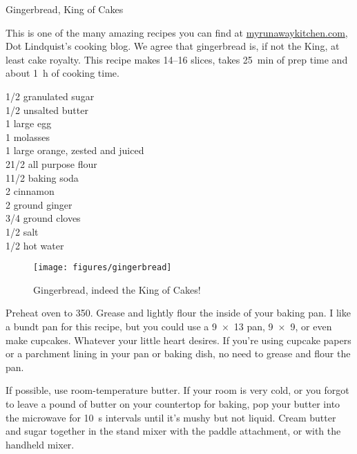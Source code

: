\begin{entry}{Gingerbread, King of Cakes}

\begin{open}
    This is one of the many amazing recipes you can find at
    \url{myrunawaykitchen.com}, Dot Lindquist's cooking blog.  We agree that
    gingerbread is, if not the King, at least cake royalty.  This recipe makes
    \numrange{14}{16} slices, takes \SI{25}{\minute} of prep time and about
    \SI{1}{\hour} of cooking time.
\end{open}
\begin{ingredients}
    \SI{1/2}{\cup}  granulated sugar\\
    \SI{1/2}{\cup}  unsalted butter\\
    1 large egg\\
    \SI{1}{\cup} molasses\\
    1 large orange, zested and juiced\\
    2\SI{1/2}{\cup}  all purpose flour\\
    1\SI{1/2}{\teaspoon}  baking soda\\
    \SI{2}{\teaspoon} cinnamon\\
    \SI{2}{\teaspoon} ground ginger\\
    \SI{3/4}{\teaspoon}   ground cloves\\
    \SI{1/2}{\teaspoon}  salt\\
    \SI{1/2}{\cup}  hot water
\end{ingredients}
\begin{figure}
    \centering
    \texttt{[image: figures/gingerbread]}
    \caption{Gingerbread, indeed the King of Cakes!}
\end{figure}
Preheat oven to \SI{350}{\degreeF}. Grease and lightly flour the inside of your
baking pan. I like a bundt pan for this recipe, but you could use a
\SI{9x13}{\inch} pan, \SI{9x9}{\inch}, or even make cupcakes. Whatever your
little heart desires. If you're using cupcake papers or a parchment lining in
your pan or baking dish, no need to grease and flour the pan.

If possible, use room-temperature butter. If your room is very cold, or you
forgot to leave a pound of butter on your countertop for baking, pop your butter
into the microwave for \SI{10}{\second} intervals until it's mushy but not
liquid. Cream butter and sugar together in the stand mixer with the paddle
attachment, or with the handheld mixer.


\end{entry}
